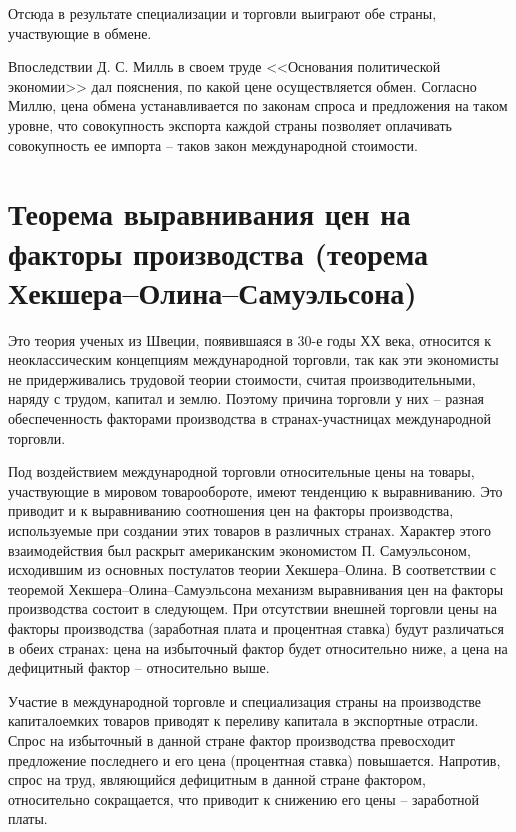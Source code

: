 Отсюда в результате специализации и торговли выиграют обе страны, участвующие в
обмене.

Впоследствии Д. С. Милль в своем труде <<Основания политической экономии>> дал
пояснения, по какой цене осуществляется обмен. Согласно Миллю, цена обмена
устанавливается по законам спроса и предложения на таком уровне, что
совокупность экспорта каждой страны позволяет оплачивать совокупность ее
импорта -- таков закон международной стоимости.

\vspace*{2em} %

\section{Теорема выравнивания цен на факторы производства (теорема
Хекшера--Олина--Самуэльсона)}

Это теория ученых из Швеции, появившаяся в 30-е годы ХХ века, относится к
неоклассическим концепциям международной торговли, так как эти экономисты не
придерживались трудовой теории стоимости, считая производительными, наряду с
трудом, капитал и землю. Поэтому причина торговли у них -- разная
обеспеченность факторами производства в странах-участницах международной
торговли.

Под воздействием международной торговли относительные цены на товары,
участвующие в мировом товарообороте, имеют тенденцию к выравниванию. Это
приводит и к выравниванию соотношения цен на факторы производства, используемые
при создании этих товаров в различных странах. Характер этого взаимодействия
был раскрыт американским экономистом П. Самуэльсоном, исходившим из основных
постулатов теории Хекшера--Олина. В соответствии с теоремой
Хекшера--Олина--Самуэльсона механизм выравнивания цен на факторы производства
состоит в следующем. При отсутствии внешней торговли цены на факторы
производства (заработная плата и процентная ставка) будут различаться в обеих
странах: цена на избыточный фактор будет относительно ниже, а цена на
дефицитный фактор -- относительно выше.

Участие в международной торговле и специализация страны на производстве
капиталоемких товаров приводят к переливу капитала в экспортные отрасли. Спрос
на избыточный в данной стране фактор производства превосходит предложение
последнего и его цена (процентная ставка) повышается. Напротив, спрос на труд,
являющийся дефицитным в данной стране фактором, относительно сокращается, что
приводит к снижению его цены -- заработной платы.

